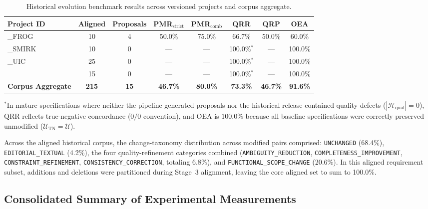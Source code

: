 \documentclass[journal]{IEEEtran}
\begin{document}
\begin{table}[htbp]
\centering
\caption{Historical evolution benchmark results across versioned projects and corpus aggregate.}
\label{tab:evolution-results}
\small
\setlength{\tabcolsep}{2.5pt}
\begin{tabularx}{\columnwidth}{@{}>{\raggedright\arraybackslash}Xccccccc@{}}
\toprule
\textbf{Project ID} & \textbf{Aligned} & \textbf{Proposals} & \textbf{PMR$_{\text{strict}}$} & \textbf{PMR$_{\text{comb}}$} & \textbf{QRR} & \textbf{QRP} & \textbf{OEA} \\
\midrule
1\_FROG   & 10 & 4 & 50.0\% & 75.0\%  & 66.7\% & 50.0\% & 60.0\% \\
2\_SMIRK  & 10 & 0 & ---    & ---     & 100.0\%$^*$ & ---    & 100.0\% \\
4\_UIC    & 25 & 0 & ---    & ---     & 100.0\%$^*$ & ---    & 100.0\% \\
15        & 15 & 0 & ---    & ---     & 100.0\%$^*$ & ---    & 100.0\% \\
\midrule
\textbf{Corpus Aggregate} & \textbf{215} & \textbf{15} & \textbf{46.7\%} & \textbf{80.0\%} & \textbf{73.3\%} & \textbf{46.7\%} & \textbf{91.6\%} \\
\bottomrule
\end{tabularx}
\vspace{1pt}
\flushleft
\scriptsize{$^*$In mature specifications where neither the pipeline generated proposals nor the historical release contained quality defects ($|\mathcal{H}_{\text{qual}}| = 0$), QRR reflects true-negative concordance ($0/0$ convention), and OEA is $100.0\%$ because all baseline specifications were correctly preserved unmodified ($\mathcal{U}_{\text{TN}} = \mathcal{U}$).}
\end{table}

Across the aligned historical corpus, the change-taxonomy distribution across modified pairs comprised: \texttt{UNCHANGED} (68.4\%), \texttt{EDITORIAL\_TEXTUAL} (4.2\%), the four quality-refinement categories combined (\texttt{AMBIGUITY\_REDUCTION}, \texttt{COMPLETENESS\_IMPROVEMENT}, \texttt{CONSTRAINT\_REFINEMENT}, \texttt{CONSISTENCY\_CORRECTION}, totaling 6.8\%), and \texttt{FUNCTIONAL\_SCOPE\_CHANGE} (20.6\%). In this aligned requirement subset, additions and deletions were partitioned during Stage~3 alignment, leaving the core aligned set to sum to 100.0\%.

\subsection{Consolidated Summary of Experimental Measurements}
\label{sec:results-summary}
\end{document}
